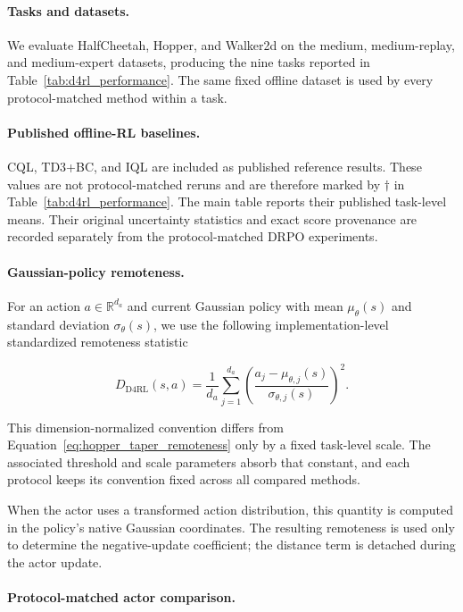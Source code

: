 \documentclass[sigconf,anonymous,review]{acmart}
\theoremstyle{acmdefinition}
\begin{document}
\paragraph{Tasks and datasets.}

We evaluate HalfCheetah, Hopper, and Walker2d on the medium,
medium-replay, and medium-expert datasets, producing the nine tasks
reported in Table~\ref{tab:d4rl_performance}. The same fixed offline
dataset is used by every protocol-matched method within a task.

\paragraph{Published offline-RL baselines.}

CQL, TD3+BC, and IQL are included as published reference results.
These values are not protocol-matched reruns and are therefore marked
by \(\dagger\) in Table~\ref{tab:d4rl_performance}. The main table
reports their published task-level means. Their original uncertainty
statistics and exact score provenance are recorded separately from the
protocol-matched DRPO experiments.

\paragraph{Gaussian-policy remoteness.}

For an action \(a\in\mathbb{R}^{d_a}\) and current Gaussian policy with
mean \(\mu_\theta(s)\) and standard deviation \(\sigma_\theta(s)\), we use the
following implementation-level standardized remoteness statistic

\[
D_{\mathrm{D4RL}}(s,a)
=
\frac{1}{d_a}
\sum_{j=1}^{d_a}
\left(
\frac{a_j-\mu_{\theta,j}(s)}
     {\sigma_{\theta,j}(s)}
\right)^2.
\]

This dimension-normalized convention differs from
Equation~\eqref{eq:hopper_taper_remoteness} only by a fixed task-level scale.
The associated threshold and scale parameters absorb that constant, and each
protocol keeps its convention fixed across all compared methods.

When the actor uses a transformed action distribution, this quantity is
computed in the policy's native Gaussian coordinates. The resulting
remoteness is used only to determine the negative-update coefficient;
the distance term is detached during the actor update.

\paragraph{Protocol-matched actor comparison.}
\end{document}
